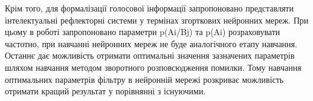 Крім того, для формалізації голосової інформації запропоновано представляти інтелектуальні рефлекторні системи у термінах згорткових нейронних мереж. При цьому в роботі запропоновано параметри p(Ai/Bj) та p(Ai) розраховувати частотно, при навчанні нейронних мереж не буде аналогічного етапу навчання. Останнє дає можливість отримати оптимальні значення зазначених параметрів шляхом навчання методом зворотного розповсюдження помилки. Тому навчання оптимальних параметрів фільтру в нейронній мережі розкриває можливість отримати кращий результат у порівнянні з існуючими. 
